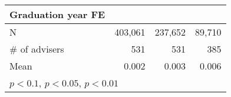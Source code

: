{\begin{tabular}{l*{3}{D{.}{.}{-1}}}
\addlinespace
Graduation year FE            	&     \checkmark         	&     \checkmark         	&     \checkmark         \\
\midrule
N                             	&        403,061         	&        237,652         	&         89,710         \\
\# of advisers                	&            531         	&            531         	&            385         \\
Mean                          	&          0.002         	&          0.003         	&          0.006         \\
\bottomrule
{}\\
\end{tabular}
}
